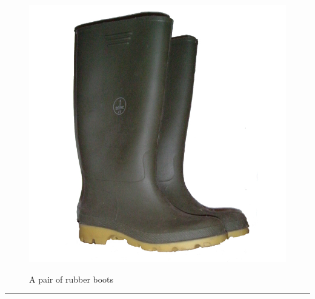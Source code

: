 \documentclass{article}
\begin{document}
    \begin{figure}[H]
        \centering
        \begin{minipage}{0.25\textwidth}
            \centering
            \includegraphics[width=\textwidth]{../SurvivalItemImages/rubberboots}
        \end{minipage}\hfill
        \begin{minipage}{0.7\textwidth}
            \centering
            \Large A pair of rubber boots
        \end{minipage}
    \end{figure}
    \vspace{-0.8em}
    \noindent\rule{\textwidth}{0.4pt}
            
    \clearpage
\end{document}
